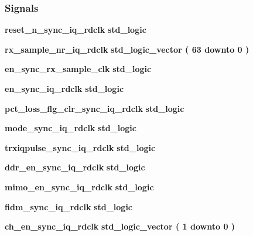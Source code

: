 \subsubsection*{Signals}
 \begin{DoxyCompactItemize}
\item 
{\bf reset\+\_\+n\+\_\+sync\+\_\+iq\+\_\+rdclk} {\bfseries \textcolor{comment}{std\+\_\+logic}\textcolor{vhdlchar}{ }} 
\item 
{\bf rx\+\_\+sample\+\_\+nr\+\_\+iq\+\_\+rdclk} {\bfseries \textcolor{comment}{std\+\_\+logic\+\_\+vector}\textcolor{vhdlchar}{ }\textcolor{vhdlchar}{(}\textcolor{vhdlchar}{ }\textcolor{vhdlchar}{ } \textcolor{vhdldigit}{63} \textcolor{vhdlchar}{ }\textcolor{keywordflow}{downto}\textcolor{vhdlchar}{ }\textcolor{vhdlchar}{ } \textcolor{vhdldigit}{0} \textcolor{vhdlchar}{ }\textcolor{vhdlchar}{)}\textcolor{vhdlchar}{ }} 
\item 
{\bf en\+\_\+sync\+\_\+rx\+\_\+sample\+\_\+clk} {\bfseries \textcolor{comment}{std\+\_\+logic}\textcolor{vhdlchar}{ }} 
\item 
{\bf en\+\_\+sync\+\_\+iq\+\_\+rdclk} {\bfseries \textcolor{comment}{std\+\_\+logic}\textcolor{vhdlchar}{ }} 
\item 
{\bf pct\+\_\+loss\+\_\+flg\+\_\+clr\+\_\+sync\+\_\+iq\+\_\+rdclk} {\bfseries \textcolor{comment}{std\+\_\+logic}\textcolor{vhdlchar}{ }} 
\item 
{\bf mode\+\_\+sync\+\_\+iq\+\_\+rdclk} {\bfseries \textcolor{comment}{std\+\_\+logic}\textcolor{vhdlchar}{ }} 
\item 
{\bf trxiqpulse\+\_\+sync\+\_\+iq\+\_\+rdclk} {\bfseries \textcolor{comment}{std\+\_\+logic}\textcolor{vhdlchar}{ }} 
\item 
{\bf ddr\+\_\+en\+\_\+sync\+\_\+iq\+\_\+rdclk} {\bfseries \textcolor{comment}{std\+\_\+logic}\textcolor{vhdlchar}{ }} 
\item 
{\bf mimo\+\_\+en\+\_\+sync\+\_\+iq\+\_\+rdclk} {\bfseries \textcolor{comment}{std\+\_\+logic}\textcolor{vhdlchar}{ }} 
\item 
{\bf fidm\+\_\+sync\+\_\+iq\+\_\+rdclk} {\bfseries \textcolor{comment}{std\+\_\+logic}\textcolor{vhdlchar}{ }} 
\item 
{\bf ch\+\_\+en\+\_\+sync\+\_\+iq\+\_\+rdclk} {\bfseries \textcolor{comment}{std\+\_\+logic\+\_\+vector}\textcolor{vhdlchar}{ }\textcolor{vhdlchar}{(}\textcolor{vhdlchar}{ }\textcolor{vhdlchar}{ } \textcolor{vhdldigit}{1} \textcolor{vhdlchar}{ }\textcolor{keywordflow}{downto}\textcolor{vhdlchar}{ }\textcolor{vhdlchar}{ } \textcolor{vhdldigit}{0} \textcolor{vhdlchar}{ }\textcolor{vhdlchar}{)}\textcolor{vhdlchar}{ }} 

\end{DoxyCompactItemize}
